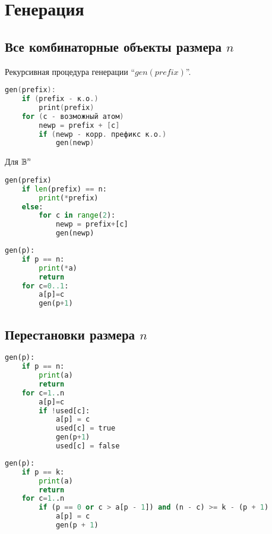 

\cfoot{}
\rfoot{\today}

\usepackage{listings}

\lstset{basicstyle=\ttfamily\footnotesize, breaklines=true}


\section{Генерация}
\subsection{Все комбинаторные объекты размера $n$}

Рекурсивная процедура генерации ``$gen(prefix)$''.

\begin{lstlisting}[frame=single, language=C, columns=fullflexible]
gen(prefix):
    if (prefix - к.о.)
        print(prefix)
    for (c - возможный атом)
        newp = prefix + [c]
        if (newp - корр. префикс к.о.)
            gen(newp)
\end{lstlisting}

Для $\operatorname*{\mathbb{B}}^n$

\begin{lstlisting}[frame=single, language=Python, columns=fullflexible]
gen(prefix)
    if len(prefix) == n:
        print(*prefix)
    else:
        for c in range(2):
            newp = prefix+[c]
            gen(newp)
\end{lstlisting}

\begin{lstlisting}[frame=single, language=Python, columns=fullflexible]
gen(p):
    if p == n:
        print(*a)
        return
    for c=0..1:
        a[p]=c
        gen(p+1)
\end{lstlisting}

\subsection{Перестановки размера $n$}
\begin{lstlisting}[frame=single, language=Python, columns=fullflexible]
gen(p):
    if p == n:
        print(a)
        return
    for c=1..n
        a[p]=c
        if !used[c]:
            a[p] = c
            used[c] = true
            gen(p+1)
            used[c] = false
\end{lstlisting}
\begin{lstlisting}[frame=single, language=Python, columns=fullflexible]
gen(p):
    if p == k:
        print(a)
        return
    for c=1..n
        if (p == 0 or c > a[p - 1]) and (n - c) >= k - (p + 1)
            a[p] = c
            gen(p + 1)
\end{lstlisting}
